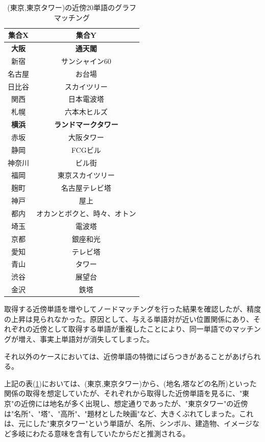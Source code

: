 \begin{table}[h]
\begin{minipage}[t]{.45\textwidth}
    \caption[(東京,東京タワー)の近傍20単語のグラフマッチング]{(東京,東京タワー)の近傍20単語のグラフマッチング}
    \label{ttt}
    \begin{center}
      \begin{tabular}{|c||c|} \hline
        集合X & 集合Y \\ \hline \hline
        \textbf{大阪} & \textbf{通天閣} \\
        新宿 & サンシャイン60 \\
        名古屋 & お台場 \\
        日比谷 & スカイツリー \\
        関西 & 日本電波塔 \\
        札幌 & 六本木ヒルズ \\
        \textbf{横浜} & \textbf{ランドマークタワー} \\
        赤坂 & 大阪タワー \\
        静岡 & FCGビル \\
        神奈川 & ビル街 \\ \hline
        福岡 & 東京スカイツリー \\
        麹町 & 名古屋テレビ塔 \\
        神戸 & 屋上 \\
        都内 & オカンとボクと、時々、オトン \\
        埼玉 & 電波塔 \\
        京都 & 銀座和光 \\
        愛知 & テレビ塔 \\
        青山 & タワー \\
        渋谷 & 展望台 \\
        金沢 & 鉄塔 \\ \hline
      \end{tabular}
    \end{center}
  \end{minipage}
\end{table}

取得する近傍単語を増やしてノードマッチングを行った結果を確認したが、精度の上昇は見られなかった。原因として、与える単語対が近い位置関係にあり、それぞれの近傍として取得する単語が重複したことにより、同一単語でのマッチングが増え、事実上単語対が消失してしまった。

それ以外のケースにおいては、近傍単語の特徴にばらつきがあることがあげられる。

上記の表(\ref{ttt})においては、(東京,東京タワー)から、(地名,塔などの名所)といった関係の取得を想定していたが、それぞれから取得した近傍単語を見るに、"東京"の近傍には地名が多く出現し、想定通りであったが、"東京タワー"の近傍は"名所"、"塔"、"高所"、"題材とした映画"など、大きくぶれてしまった。これは、元にした"東京タワー"という単語が、名所、シンボル、建造物、イメージなど多岐にわたる意味を含有していたからだと推測される。

